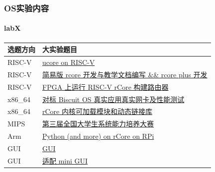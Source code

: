 \documentclass[UTF8]{ctexbeamer}
\begin{document}
\begin{frame}
	\frametitle{OS实验内容}
	\framesubtitle{labX}
	
\begin{longtable}[]{@{}|l|l|@{}}
	\toprule
	选题方向 & 大实验题目\tabularnewline
	\midrule
	\endhead
	RISC-V &
	\href{http://os.cs.tsinghua.edu.cn/oscourse/OS2019spring/projects/g01}{ucore
		on RISC-V}\tabularnewline  \hline
	RISC-V &
	\href{http://os.cs.tsinghua.edu.cn/oscourse/OS2019spring/projects/g02}{简易版
		rcore 开发与教学文档编写 \&\& rcore plus 开发}\tabularnewline \hline
	RISC-V &
	\href{http://os.cs.tsinghua.edu.cn/oscourse/OS2019spring/projects/g05}{FPGA
		上运行 RISC-V rCore 构建路由器}\tabularnewline \hline
	x86\_64 &
	\href{http://os.cs.tsinghua.edu.cn/oscourse/OS2019spring/projects/g04}{对标
		Biscuit OS 真实应用真实网卡及性能测试}\tabularnewline \hline
	x86\_64 &
	\href{http://os.cs.tsinghua.edu.cn/oscourse/OS2019spring/projects/g06}{rCore
		内核可加载模块和动态链接库}\tabularnewline \hline
	MIPS &
	\href{http://os.cs.tsinghua.edu.cn/oscourse/OS2019spring/projects/g03}{第三届全国大学生系统能力培养大赛}\tabularnewline \hline
	Arm &
	\href{http://os.cs.tsinghua.edu.cn/oscourse/OS2019spring/projects/g11}{Python
		(and more) on rCore on RPi}\tabularnewline \hline
	GUI &
	\href{http://os.cs.tsinghua.edu.cn/oscourse/OsTrain2019/g2}{GUI}\tabularnewline \hline
	GUI & \href{http://os.cs.tsinghua.edu.cn/oscourse/OsTrain2019/g3}{适配
		mini GUI}\tabularnewline \hline

	
	\bottomrule
\end{longtable}


\end{frame}
\end{document}
